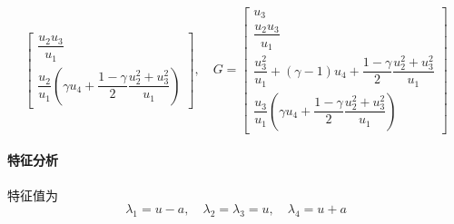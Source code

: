 \documentclass{article}
\numberwithin{equation}{subsection}    %
\begin{document}
\begin{appendix}
\begin{equation}
\begin{bmatrix}
            \dfrac{u_2u_3}{u_1}                                                          \\
            \dfrac{u_2}{u_1}\left(\gamma u_4+\dfrac{1-\gamma}{2}\dfrac{u_2^2+u_3^2}{u_1}\right)
        \end{bmatrix}
        ,\quad G=\begin{bmatrix}
            u_3                                                                          \\
            \dfrac{u_2u_3}{u_1}                                                          \\
            \dfrac{u_3^2}{u_1}+(\gamma-1)u_4+\dfrac{1-\gamma}{2}\dfrac{u_2^2+u_3^2}{u_1} \\
            \dfrac{u_3}{u_1}\left(\gamma u_4+\dfrac{1-\gamma}{2}\dfrac{u_2^2+u_3^2}{u_1}\right)
        \end{bmatrix}
    \end{equation}

    \paragraph{特征分析}
    特征值为
    \begin{equation}
        \lambda_{1}=u-a, \quad \lambda_{2}=\lambda_{3}=u, \quad \lambda_{4}=u+a
    \end{equation}


\end{appendix}
\end{document}
